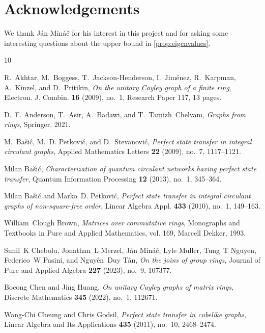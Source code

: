 \documentclass[12pt, a4paper]{amsart}
\theoremstyle{definition}
\numberwithin{equation}{section}
\begin{document}
\section*{Acknowledgements}
We thank  J\'an Min\'a\v{c} for his interest in this project and for asking some interesting questions about the upper bound in \cref{prop:eigenvalues}. 
\begin{thebibliography}{10}

R.~Akhtar, M.~Boggess, T.~Jackson-Henderson, I.~Jim{\'e}nez, R.~Karpman, A.~Kinzel, and D.~Pritikin, \emph{On the unitary {Cayley} graph of a finite ring}, Electron. J. Combin. \textbf{16} (2009), no.~1, Research Paper 117, 13 pages.

D.~F. Anderson, T.~Asir, A.~Badawi, and T.~Tamizh~Chelvam, \emph{Graphs from rings}, Springer, 2021.

M.~Ba{\v{s}}i{\'c}, M.~D. Petkovi{\'c}, and D.~Stevanovi{\'c}, \emph{Perfect state transfer in integral circulant graphs}, Applied Mathematics Letters \textbf{22} (2009), no.~7, 1117--1121.

Milan Ba{\v{s}}i{\'c}, \emph{Characterization of quantum circulant networks having perfect state transfer}, Quantum Information Processing \textbf{12} (2013), no.~1, 345--364.

Milan Ba{\v{s}}i{\'c} and Marko~D. Petkovi\'c, \emph{Perfect state transfer in integral circulant graphs of non-square-free order}, Linear Algebra Appl. \textbf{433} (2010), no.~1, 149--163. 

William~Clough Brown, \emph{Matrices over commutative rings}, Monographs and Textbooks in Pure and Applied Mathematics, vol. 169, Marcell Dekker, 1993.

Sunil~K Chebolu, Jonathan~L Merzel, J{\'a}n Min{\'a}{\v{c}}, Lyle Muller, Tung~T Nguyen, Federico~W Pasini, and Nguy{\^e}n~Duy T{\^a}n, \emph{On the joins of group rings}, Journal of Pure and Applied Algebra \textbf{227} (2023), no.~9, 107377.

Bocong Chen and Jing Huang, \emph{On unitary {Cayley} graphs of matrix rings}, Discrete Mathematics \textbf{345} (2022), no.~1, 112671.

Wang-Chi Cheung and Chris Godsil, \emph{Perfect state transfer in cubelike graphs}, Linear Algebra and Its Applications \textbf{435} (2011), no.~10, 2468--2474.


\end{thebibliography}
\end{document}

